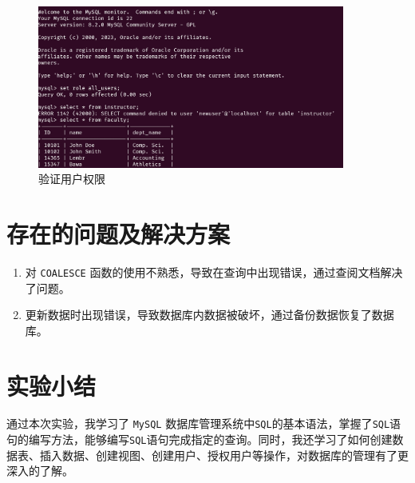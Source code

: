 \documentclass{article}
\begin{document}
\begin{enumerate}
\begin{figure}[H]
\centering
\includegraphics[width=0.9\textwidth]{img/42.png}
\caption{验证用户权限}
\end{figure}

\end{enumerate}

\section{存在的问题及解决方案}

\begin{enumerate}
  \item 对 \texttt{COALESCE} 函数的使用不熟悉，导致在查询中出现错误，通过查阅文档解决了问题。
  \item 更新数据时出现错误，导致数据库内数据被破坏，通过备份数据恢复了数据库。
\end{enumerate}

\section{实验小结}

通过本次实验，我学习了 \texttt{MySQL} 数据库管理系统中\texttt{SQL}的基本语法，掌握了\texttt{SQL}语
句的编写方法，能够编写\texttt{SQL}语句完成指定的查询。同时，我还学习了如何创建数据表、插入数据、创建视图、创建用户、授权用户等操作，对数据库的管理有了更深入的了解。
\end{document}
